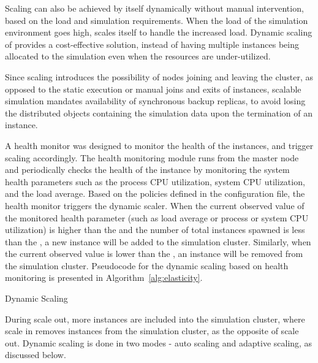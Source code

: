 Scaling can also be achieved by  itself dynamically without manual intervention, based on the load and simulation requirements. When the load of the simulation environment goes high,  scales itself to handle the increased load. Dynamic scaling of  provides a cost-effective solution, instead of having multiple instances being allocated to the simulation even when the resources are under-utilized.

Since scaling introduces the possibility of nodes joining and leaving the cluster, as opposed to the static execution or manual joins and exits of instances, scalable simulation mandates availability of synchronous backup replicas, to avoid losing the distributed objects containing the simulation data upon the termination of an instance. 

A health monitor was designed to monitor the health of the instances, and trigger scaling accordingly. The health monitoring module runs from the master node and periodically checks the health of the instance by monitoring the system health parameters such as the process CPU utilization, system CPU utilization, and the load average. Based on the policies defined in the configuration file, the health monitor triggers the dynamic scaler. When the current observed value of the monitored health parameter (such as load average or process or system CPU utilization) is higher than the  and the number of total instances spawned is less than the , a new instance will be added to the simulation cluster. Similarly, when the current observed value is lower than the , an instance will be removed from the simulation cluster. Pseudocode for the dynamic scaling based on health monitoring is presented in Algorithm~\ref{alg:elasticity}.

\begin{algorithm}
  \caption{Dynamic Scaling}
\label{alg:elasticity}
  \begin{algorithmic}
\While{  }
\State 
{}
    \State {}
    \State 
\ElsIf{}
    \State {}
    \State 
\Else
    \State 
\EndIf
    \EndWhile  
  \end{algorithmic}
\end{algorithm}

During scale out, more instances are included into the simulation cluster, where scale in removes instances from the simulation cluster, as the opposite of scale out. Dynamic scaling is done in two modes - auto scaling and adaptive scaling, as discussed below.

